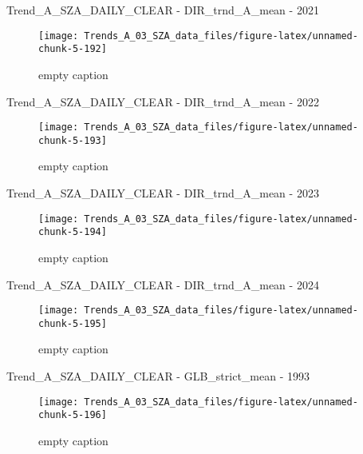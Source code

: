 \documentclass[
  10pt,
  a4paper,oneside]{article}
\begin{document}
Trend\_A\_SZA\_DAILY\_CLEAR - DIR\_trnd\_A\_mean - 2021

\begin{figure}[!ht]

{\centering \texttt{[image: Trends\_A\_03\_SZA\_data\_files/figure-latex/unnamed-chunk-5-192]} 

}

\caption{ empty caption }\label{fig:unnamed-chunk-5-192}
\end{figure}

Trend\_A\_SZA\_DAILY\_CLEAR - DIR\_trnd\_A\_mean - 2022

\begin{figure}[!ht]

{\centering \texttt{[image: Trends\_A\_03\_SZA\_data\_files/figure-latex/unnamed-chunk-5-193]} 

}

\caption{ empty caption }\label{fig:unnamed-chunk-5-193}
\end{figure}

Trend\_A\_SZA\_DAILY\_CLEAR - DIR\_trnd\_A\_mean - 2023

\begin{figure}[!ht]

{\centering \texttt{[image: Trends\_A\_03\_SZA\_data\_files/figure-latex/unnamed-chunk-5-194]} 

}

\caption{ empty caption }\label{fig:unnamed-chunk-5-194}
\end{figure}

Trend\_A\_SZA\_DAILY\_CLEAR - DIR\_trnd\_A\_mean - 2024

\begin{figure}[!ht]

{\centering \texttt{[image: Trends\_A\_03\_SZA\_data\_files/figure-latex/unnamed-chunk-5-195]} 

}

\caption{ empty caption }\label{fig:unnamed-chunk-5-195}
\end{figure}

Trend\_A\_SZA\_DAILY\_CLEAR - GLB\_strict\_mean - 1993

\begin{figure}[!ht]

{\centering \texttt{[image: Trends\_A\_03\_SZA\_data\_files/figure-latex/unnamed-chunk-5-196]} 

}

\caption{ empty caption }\label{fig:unnamed-chunk-5-196}
\end{figure}
\end{document}
